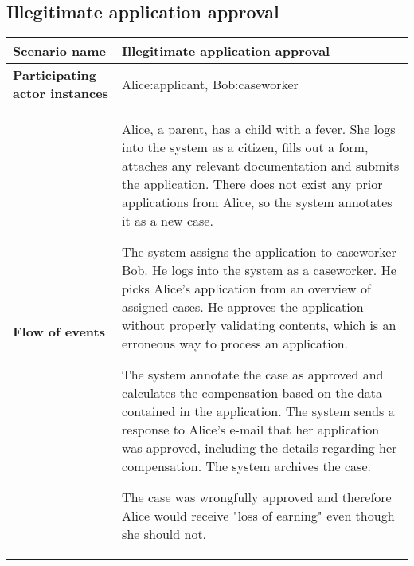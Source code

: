 \subsection*{Illegitimate application approval}
\begin{table}[htb!]
\begin{tabularx}{\textwidth}{l|X}
	\textbf{Scenario name} &  Illegitimate application approval\\
	\hline
	\textbf{Participating actor instances} & Alice:applicant, Bob:caseworker\\
	\hline
	\textbf{Flow of events} &
	\begin{compactenum}
	        \item Alice, a parent, has a child with a fever. She logs into the system as a citizen, fills out a form, attaches any relevant documentation and submits the application. There does not exist any prior applications from Alice, so the system annotates it as a new case.
	        \item The system assigns the application to caseworker Bob. He logs into the system as a caseworker. He picks Alice's application from an overview of assigned cases. He approves the application without properly validating contents, which is an erroneous way to process an application.
            \item The system annotate the case as approved and calculates the compensation based on the data contained in the application. The system sends a response to Alice's e-mail that her application was approved, including the details regarding her compensation. The system archives the case.
            \item The case was wrongfully approved and therefore Alice would receive "loss of earning" even though she should not.
	\end{compactenum}\\
	\hline
\end{tabularx}
\end{table}

